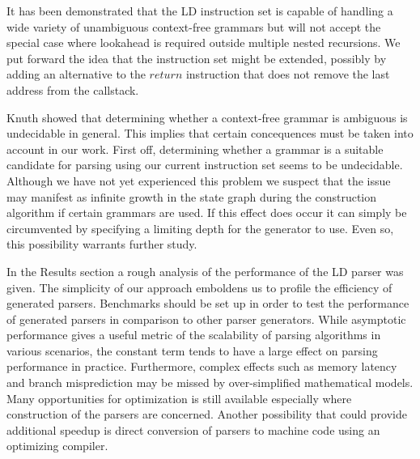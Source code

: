 \documentclass[a4paper,11pt]{article}
\begin{document}

It has been demonstrated that the LD instruction set is capable of handling a wide variety of unambiguous context-free grammars but will not accept the special case where lookahead is required outside multiple nested recursions.
We put forward the idea that the instruction set might be extended, possibly by adding an alternative to the $return$ instruction that does not remove the last address from the callstack.

Knuth showed that determining whether a context-free grammar is ambiguous is undecidable in general\cite{knuth65}. 
This implies that certain concequences must be taken into account in our work. 
First off, determining whether a grammar is a suitable candidate for parsing using our current instruction set seems to be undecidable.
Although we have not yet experienced this problem we suspect that the issue may manifest as infinite growth in the state graph during the construction algorithm if certain grammars are used.
If this effect does occur it can simply be circumvented by specifying a limiting depth for the generator to use. 
Even so, this possibility warrants further study.

In the Results section a rough analysis of the performance of the LD parser was given.
The simplicity of our approach emboldens us to profile the efficiency of generated parsers.
Benchmarks should be set up in order to test the performance of generated parsers in comparison to other parser generators.
While asymptotic performance gives a useful metric of the scalability of parsing algorithms in various scenarios, the constant term tends to have a large effect on parsing performance in practice.
Furthermore, complex effects such as memory latency and branch misprediction may be missed by over-simplified mathematical models.
Many opportunities for optimization is still available especially where construction of the parsers are concerned.
Another possibility that could provide additional speedup is direct conversion of parsers to machine code using an optimizing compiler.
\end{document}
